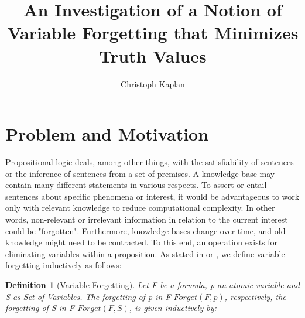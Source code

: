 \documentclass[f,proposal,palatino]{AIGpaper}
\author{Christoph Kaplan}
\title{An Investigation of a Notion of Variable Forgetting that Minimizes Truth Values}
\newtheorem{definition}{Definition}
\begin{document}
\maketitle %




\section{Problem and Motivation}
Propositional logic deals, among other things, with the satisfiability of sentences or the inference of sentences from a set of premises. A knowledge base may contain many different statements in various respects. To assert or entail sentences about specific phenomena or interest, it would be advantageous to work only with relevant knowledge to reduce computational complexity. In other words, non-relevant or irrelevant information in relation to the current interest could be "forgotten". Furthermore, knowledge bases change over time, and old knowledge might need to be contracted. To this end, an operation exists for eliminating variables within a proposition. As stated in \cite{lin1994forget} or \cite{lang2003propositional}, we define variable forgetting inductively as follows:

\begin{definition}[Variable Forgetting]
Let F be a formula, p an atomic variable and S as Set of Variables. The \emph{forgetting of p in F $\mathit{Forget}(F,p)$}, respectively, the \emph{forgetting of S in F} $Forget(F,S)$, is given inductively by:
\end{definition}
\end{document}
